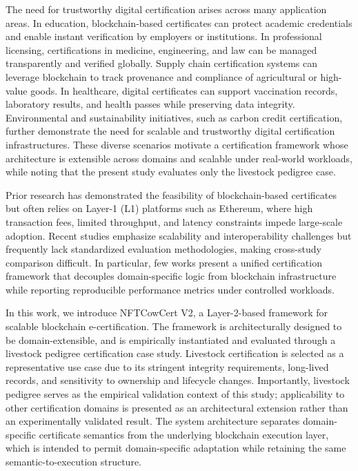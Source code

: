 \documentclass[pdflatex,sn-mathphys-num]{sn-jnl}
\begin{document}
The need for trustworthy digital certification arises across many application areas. In education, blockchain-based certificates can protect academic credentials and enable instant verification by employers or institutions. In professional licensing, certifications in medicine, engineering, and law can be managed transparently and verified globally. Supply chain certification systems can leverage blockchain to track provenance and compliance of agricultural or high-value goods. In healthcare, digital certificates can support vaccination records, laboratory results, and health passes while preserving data integrity. Environmental and sustainability initiatives, such as carbon credit certification, further demonstrate the need for scalable and trustworthy digital certification infrastructures. These diverse scenarios motivate a certification framework whose architecture is extensible across domains and scalable under real-world workloads, while noting that the present study evaluates only the livestock pedigree case.

Prior research has demonstrated the feasibility of blockchain-based certificates but often relies on Layer-1 (L1) platforms such as Ethereum, where high transaction fees, limited throughput, and latency constraints impede large-scale adoption. Recent studies emphasize scalability and interoperability challenges but frequently lack standardized evaluation methodologies, making cross-study comparison difficult. In particular, few works present a unified certification framework that decouples domain-specific logic from blockchain infrastructure while reporting reproducible performance metrics under controlled workloads.

In this work, we introduce NFTCowCert V2, a Layer-2-based framework for scalable blockchain e-certification. The framework is architecturally designed to be domain-extensible, and is empirically instantiated and evaluated through a livestock pedigree certification case study. Livestock certification is selected as a representative use case due to its stringent integrity requirements, long-lived records, and sensitivity to ownership and lifecycle changes. Importantly, livestock pedigree serves as the empirical validation context of this study; applicability to other certification domains is presented as an architectural extension rather than an experimentally validated result. The system architecture separates domain-specific certificate semantics from the underlying blockchain execution layer, which is intended to permit domain-specific adaptation while retaining the same semantic-to-execution structure.
\end{document}
